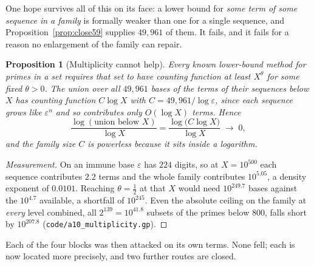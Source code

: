 \documentclass[11pt]{article}
\newtheorem{proposition}[theorem]{Proposition}
\theoremstyle{definition}
\begin{document}
One hope survives all of this on its face: a lower bound for \emph{some term of some sequence in a
family} is formally weaker than one for a single sequence, and Proposition~\ref{prop:close59}
supplies $49{,}961$ of them. It fails, and it fails for a reason no enlargement of the family can
repair.

\begin{proposition}[Multiplicity cannot help]\label{prop:multiplicityfail}
Every known lower-bound method for primes in a set requires that set to have counting function at
least $X^{\theta}$ for some fixed $\theta>0$. The union over all $49{,}961$ bases of the terms of
their sequences below $X$ has counting function $C\log X$ with $C=49{,}961/\log\varepsilon$, since
each sequence grows like $\varepsilon^n$ and so contributes only $O(\log X)$ terms. Hence
\[ \frac{\log(\text{union below }X)}{\log X}=\frac{\log\bigl(C\log X\bigr)}{\log X}\;\longrightarrow\;0 , \]
and the family size $C$ is powerless because it sits inside a logarithm.
\end{proposition}
\begin{proof}[Measurement]
On an immune base $\varepsilon$ has $224$ digits, so at $X=10^{500}$ each sequence contributes
$2.2$ terms and the whole family contributes $10^{5.05}$, a density exponent of $0.0101$. Reaching
$\theta=\tfrac12$ at that $X$ would need $10^{249.7}$ bases against the $10^{4.7}$ available, a
shortfall of $10^{245}$. Even the absolute ceiling on the family at \emph{every} level combined,
all $2^{139}=10^{41.8}$ subsets of the primes below $800$, falls short by $10^{207.8}$
\textup{(\texttt{code/a10\_multiplicity.gp})}.
\end{proof}

Each of the four blocks was then attacked on its own terms. None fell; each is now located more
precisely, and two further routes are closed.
\end{document}
